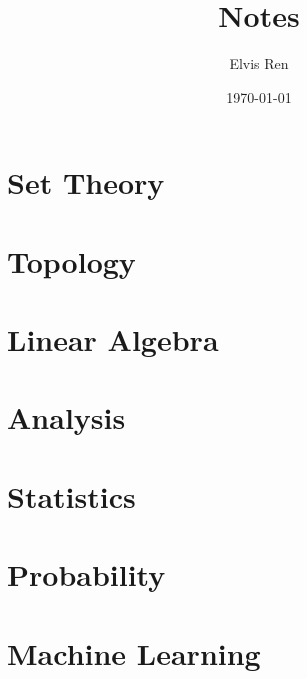 



\title{Notes}
\author{Elvis Ren}
\date{\today}

\maketitle
\tableofcontents


\part{Set Theory}


\part{Topology}


\part{Linear Algebra}


\part{Analysis}


\part{Statistics}


\part{Probability}


\part{Machine Learning}


